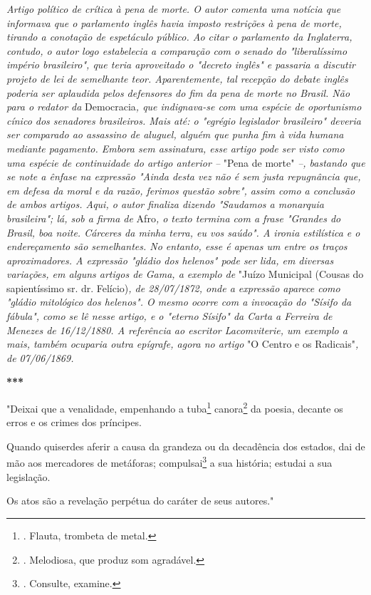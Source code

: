 \emph{Artigo político de crítica à pena de morte. O autor comenta uma
notícia que informava que o parlamento inglês havia imposto restrições à
pena de morte, tirando a conotação de espetáculo público. Ao citar o
parlamento da Inglaterra, contudo, o autor logo estabelecia a comparação
com o senado do "liberalíssimo império brasileiro", que teria
aproveitado o "decreto inglês" e passaria a discutir projeto de lei de
semelhante teor. Aparentemente, tal recepção do debate inglês poderia
ser aplaudida pelos defensores do fim da pena de morte no Brasil. Não
para o redator da} Democracia\emph{, que indignava-se com uma espécie de
oportunismo cínico dos senadores brasileiros. Mais até: o "egrégio
legislador brasileiro" deveria ser comparado ao assassino de aluguel,
alguém que punha fim à vida humana mediante pagamento. Embora sem
assinatura, esse artigo pode ser visto como uma espécie de continuidade
do artigo anterior --} "Pena de morte" \emph{--, bastando que se note a
ênfase na expressão "Ainda desta vez não é sem justa repugnância que, em
defesa da moral e da razão, ferimos questão sobre", assim como a
conclusão de ambos artigos. Aqui, o autor finaliza dizendo "Saudamos a
monarquia brasileira"; lá, sob a firma de} Afro\emph{, o texto termina
com a frase "Grandes do Brasil, boa noite. Cárceres da minha terra, eu
vos saúdo". A ironia estilística e o endereçamento são semelhantes. No
entanto, esse é apenas um entre os traços aproximadores. A expressão
"gládio dos helenos" pode ser lida, em diversas variações, em alguns
artigos de Gama, a exemplo de} "Juízo Municipal (Cousas do sapientíssimo
sr. dr. Felício)\emph{, de 28/07/1872, onde a expressão aparece como
"gládio mitológico dos helenos". O mesmo ocorre com a invocação do
"Sísifo da fábula", como se lê nesse artigo, e o "eterno Sísifo" da
Carta a Ferreira de Menezes de 16/12/1880. A referência ao escritor
Lacomviterie, um exemplo a mais, também ocuparia outra epígrafe, agora
no artigo} "O Centro e os Radicais"\emph{, de 07/06/1869.}

\textbf{***}

"Deixai que a venalidade, empenhando a tuba\footnote{. Flauta, trombeta
  de metal.} canora\footnote{. Melodiosa, que produz som agradável.} da
poesia, decante os erros e os crimes dos príncipes.

Quando quiserdes aferir a causa da grandeza ou da decadência dos
estados, dai de mão aos mercadores de metáforas; compulsai\footnote{.
  Consulte, examine.} a sua história; estudai a sua legislação.

Os atos são a revelação perpétua do caráter de seus autores."

